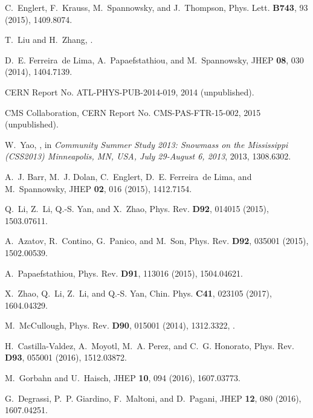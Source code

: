 \documentclass[a4paper,amsmath,preprintnumbers,showpacs,twocolumn,prl,superscriptaddress, nofootinbib]{revtex4}
\begin{document}
\begin{thebibliography}{100}
C.~Englert, F.~Krauss, M.~Spannowsky, and J.~Thompson,
\newblock Phys. Lett. {\bf B743}, 93 (2015), 1409.8074.

T.~Liu and H.~Zhang,
.

D.~E. Ferreira~de Lima, A.~Papaefstathiou, and M.~Spannowsky,
\newblock JHEP {\bf 08}, 030 (2014), 1404.7139.

CERN Report No. ATL-PHYS-PUB-2014-019, 2014 (unpublished).

CMS Collaboration,
\newblock CERN Report No. CMS-PAS-FTR-15-002, 2015 (unpublished).

W.~Yao,
,
\newblock in {\em {Community Summer Study 2013: Snowmass on the Mississippi
  (CSS2013) Minneapolis, MN, USA, July 29-August 6, 2013}}, 2013, 1308.6302.

A.~J. Barr, M.~J. Dolan, C.~Englert, D.~E. Ferreira~de Lima, and M.~Spannowsky,
\newblock JHEP {\bf 02}, 016 (2015), 1412.7154.

Q.~Li, Z.~Li, Q.-S. Yan, and X.~Zhao,
\newblock Phys. Rev. {\bf D92}, 014015 (2015), 1503.07611.

A.~Azatov, R.~Contino, G.~Panico, and M.~Son,
\newblock Phys. Rev. {\bf D92}, 035001 (2015), 1502.00539.

A.~Papaefstathiou,
\newblock Phys. Rev. {\bf D91}, 113016 (2015), 1504.04621.

X.~Zhao, Q.~Li, Z.~Li, and Q.-S. Yan,
\newblock Chin. Phys. {\bf C41}, 023105 (2017), 1604.04329.

M.~McCullough,
\newblock Phys. Rev. {\bf D90}, 015001 (2014), 1312.3322,
.

H.~Castilla-Valdez, A.~Moyotl, M.~A. Perez, and C.~G. Honorato,
\newblock Phys. Rev. {\bf D93}, 055001 (2016), 1512.03872.

M.~Gorbahn and U.~Haisch,
\newblock JHEP {\bf 10}, 094 (2016), 1607.03773.

G.~Degrassi, P.~P. Giardino, F.~Maltoni, and D.~Pagani,
\newblock JHEP {\bf 12}, 080 (2016), 1607.04251.


\end{thebibliography}
\end{document}
